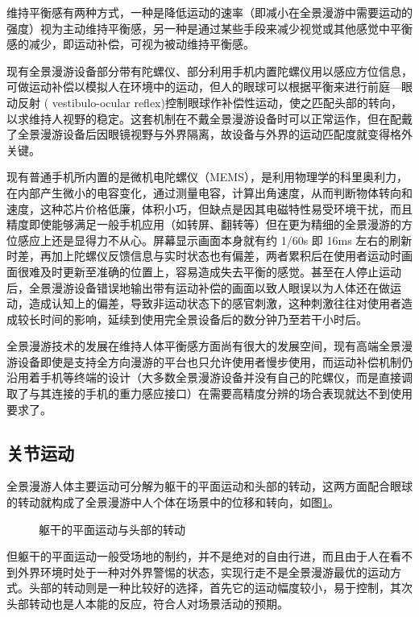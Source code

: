 维持平衡感有两种方式，一种是降低运动的速率（即减小在全景漫游中需要运动的强度）视为主动维持平衡感，另一种是通过某些手段来减少视觉或其他感觉中平衡感的减少，即运动补偿，可视为被动维持平衡感。

现有全景漫游设备部分带有陀螺仪、部分利用手机内置陀螺仪用以感应方位信息，可做运动补偿以模拟人在环境中的运动，但人的眼球可以根据平衡来进行前庭—眼动反射 ( vestibulo-ocular reflex)控制眼球作补偿性运动，使之匹配头部的转向，以求维持人视野的稳定。这套机制在不戴全景漫游设备时可以正常运作，但在配戴了全景漫游设备后因眼镜视野与外界隔离，故设备与外界的运动匹配度就变得格外关键。

现有普通手机所内置的是微机电陀螺仪（MEMS），是利用物理学的科里奥利力，在内部产生微小的电容变化，通过测量电容，计算出角速度，从而判断物体转向和速度，这种芯片价格低廉，体积小巧，但缺点是因其电磁特性易受环境干扰，而且精度即使能够满足一般手机应用（如转屏、翻转等）但在更为精细的全景漫游的方位感应上还是显得力不从心。屏幕显示画面本身就有约 1/60s 即 16ms 左右的刷新时差，再加上陀螺仪反馈信息与实时状态也有偏差，两者累积后在使用者运动时画面很难及时更新至准确的位置上，容易造成失去平衡的感觉。甚至在人停止运动后，全景漫游设备错误地输出带有运动补偿的画面以致人眼误以为人体还在做运动，造成认知上的偏差，导致非运动状态下的感官刺激，这种刺激往往对使用者造成较长时间的影响，延续到使用完全景设备后的数分钟乃至若干小时后。

全景漫游技术的发展在维持人体平衡感方面尚有很大的发展空间，现有高端全景漫游设备即使是支持全方向漫游的平台也只允许使用者慢步使用，而运动补偿机制仍沿用着手机等终端的设计（大多数全景漫游设备并没有自己的陀螺仪，而是直接调取了与其连接的手机的重力感应接口）在需要高精度分辨的场合表现就达不到使用要求了。

\subsection{关节运动}

全景漫游人体主要运动可分解为躯干的平面运动和头部的转动，这两方面配合眼球的转动就构成了全景漫游中人个体在场景中的位移和转向，如图\ref{fig:act}。

\begin{figure}[htp]
\centering
{}
\caption{躯干的平面运动与头部的转动}
\label{fig:act}
\end{figure}

但躯干的平面运动一般受场地的制约，并不是绝对的自由行进，而且由于人在看不到外界环境时处于一种对外界警惕的状态，实现行走不是全景漫游最优的运动方式。头部的转动则是一种比较好的选择，首先它的运动幅度较小，易于控制，其次头部转动也是人本能的反应，符合人对场景活动的预期。


